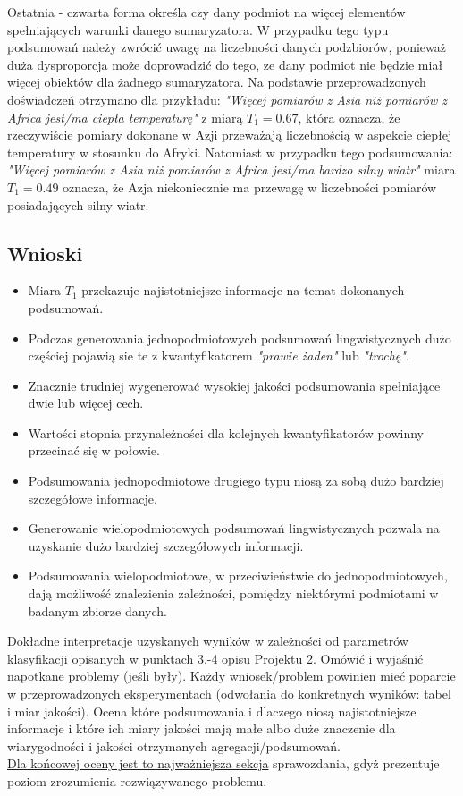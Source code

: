 \documentclass{article}
\begin{document}
Ostatnia - czwarta forma określa czy dany podmiot na więcej elementów spełniających warunki danego sumaryzatora. W przypadku tego typu podsumowań należy zwrócić uwagę na liczebności danych podzbiorów, ponieważ duża dysproporcja może doprowadzić do tego, ze dany podmiot nie będzie miał więcej obiektów dla żadnego sumaryzatora. Na podstawie przeprowadzonych doświadczeń otrzymano dla przykładu: \textit{"Więcej pomiarów z Asia niż pomiarów z Africa jest/ma ciepła temperaturę"} z miarą \(T_1 = 0.67\), która oznacza, że rzeczywiście pomiary dokonane w Azji przeważają liczebnością w aspekcie ciepłej temperatury w stosunku do Afryki. Natomiast w przypadku tego podsumowania: \textit{"Więcej pomiarów z Asia niż pomiarów z Africa jest/ma bardzo silny wiatr"} miara \(T_1 = 0.49\) oznacza, że Azja niekoniecznie ma przewagę w liczebności pomiarów posiadających silny wiatr.

\subsection{Wnioski}
\begin{itemize}
    \item Miara \(T_1\) przekazuje najistotniejsze informacje na temat dokonanych podsumowań. 
    \item Podczas generowania jednopodmiotowych podsumowań lingwistycznych dużo częściej pojawią sie te z kwantyfikatorem \textit{"prawie żaden"} lub \textit{"trochę"}.
    \item Znacznie trudniej wygenerować wysokiej jakości podsumowania spełniające dwie lub więcej cech.
    \item Wartości stopnia przynależności dla kolejnych kwantyfikatorów powinny przecinać się w połowie.
    \item Podsumowania jednopodmiotowe drugiego typu niosą za sobą dużo bardziej szczegółowe informacje.
    \item Generowanie wielopodmiotowych podsumowań lingwistycznych pozwala na uzyskanie dużo bardziej szczegółowych informacji.
    \item Podsumowania wielopodmiotowe, w przeciwieństwie do jednopodmiotowych, dają możliwość znalezienia zależności, pomiędzy niektórymi podmiotami w badanym zbiorze danych. 
\end{itemize}

Dokładne interpretacje uzyskanych wyników w zależności od parametrów klasyfikacji
opisanych w punktach 3.-4 opisu Projektu 2. 
Omówić i wyjaśnić napotkane problemy (jeśli były). Każdy wniosek/problem powinien mieć poparcie
w przeprowadzonych eksperymentach (odwołania do konkretnych wyników: tabel i miar
jakości). Ocena które podsumowania i dlaczego niosą najistotniejsze informacje
i które ich miary jakości mają małe albo duże znaczenie dla wiarygodności i jakości otrzymanych
agregacji/podsumowań.  \\
\underline{Dla końcowej oceny jest to najważniejsza sekcja} sprawozdania, gdyż prezentuje poziom
zrozumienia rozwiązywanego problemu.\\
\end{document}

